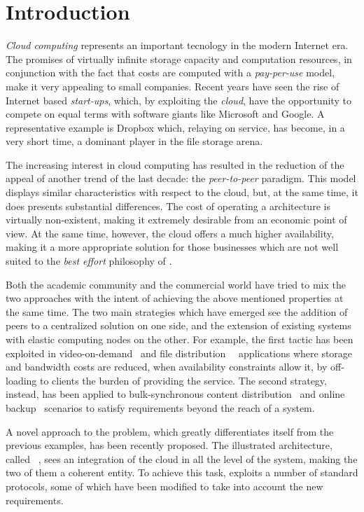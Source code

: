 \chapter{Introduction}
\textit{Cloud computing} represents an important tecnology in the
modern Internet era. The promises of virtually infinite storage
capacity and computation resources, in conjunction with the fact that
costs are computed with a \textit{pay-per-use} model, make it very
appealing to small companies. Recent years have seen the rise of Internet based
\textit{start-ups}, which, by exploiting the \emph{cloud}, have the opportunity
to compete on equal terms with software giants like Microsoft
and Google. A representative example is Dropbox which, relaying on
\amazonsss service, has become, in a very short time, a dominant player
in the file storage arena.

The increasing interest in cloud computing has resulted in the
reduction of the appeal of another trend of the last decade: the \emph{peer-to-peer}
paradigm. This model displays similar characteristics with respect to
the cloud, but, at the same time, it does presents substantial
differences. The
cost of operating a \ptop architecture is virtually non-existent,
making it extremely desirable from an economic point of view. At the
same time, however, the cloud offers a much higher availability,
making it a more appropriate solution for those businesses which are not
well suited to the \textit{best effort} philosophy of \ptop.

Both the academic community and the commercial world have tried to mix
the two approaches with the intent of achieving the above mentioned
properties at the same time. The two main strategies which have
emerged see the
addition of peers to a centralized solution on one side, and the
extension of existing \ptop systems with elastic computing nodes on
the other.
For example, the first tactic has been exploited in
video-on-demand~\cite{PeerAssistedVoD} and file
distribution~\cite{BitTorrentRobustness}~\cite{AmazingStore}
applications where storage
and bandwidth costs are reduced, when availability
constraints allow it, by off-loading to clients the burden of
providing the service. The second strategy, instead, has been applied
to bulk-synchronous content distribution~\cite{AngelsInCloud}
and online backup~\cite{PeerAssistedOnlineDataBackup} scenarios to
satisfy requirements beyond the reach of a \ptop system.

A novel approach to the problem, which greatly differentiates itself
from the previous examples, has been recently proposed. The
illustrated architecture, called \cloudcast~\cite{Cloudcast}, sees an
integration of the cloud in all the level of the \ptop system, making
the two of them a coherent entity. To achieve this task, \cloudcast
exploits a number of standard \ptop protocols, some of which have been
modified to take into account the new requirements.

